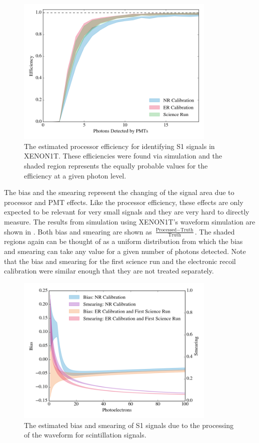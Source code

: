 \begin{figure}[t]
        \centering
	\includegraphics[width=0.85\textwidth]{xe1t_pax_acceptance}
	\caption{The estimated processor efficiency for identifying S1 signals in XENON1T.  These efficiencies were found via simulation and the shaded region represents the equally probable values for the efficiency at a given photon level.}
	\label{fig:xe1t_pax_acceptance}
\end{figure}


The bias and the smearing represent the changing of the signal area due to processor and PMT effects.  Like the processor efficiency, these effects are only expected to be relevant for very small signals and they are very hard to directly measure.  The results from simulation using XENON1T's waveform simulation are shown in .  Both bias and smearing are shown as $\frac{\textrm{Processed} - \textrm{Truth}}{\textrm{Truth}}$.  The shaded regions again can be thought of as a uniform distribution from which the bias and smearing can take any value for a given number of photons detected.  Note that the bias and smearing for the first science run and the electronic recoil calibration were similar enough that they are not treated separately.

\begin{figure}[t]
	\centering
	\includegraphics[width=0.85\textwidth]{xe1t_pax_s1_bias}
	\caption{The estimated bias and smearing of S1 signals due to the processing of the waveform for scintillation signals.}
	\label{fig:xe1t_pax_sb}
\end{figure}

